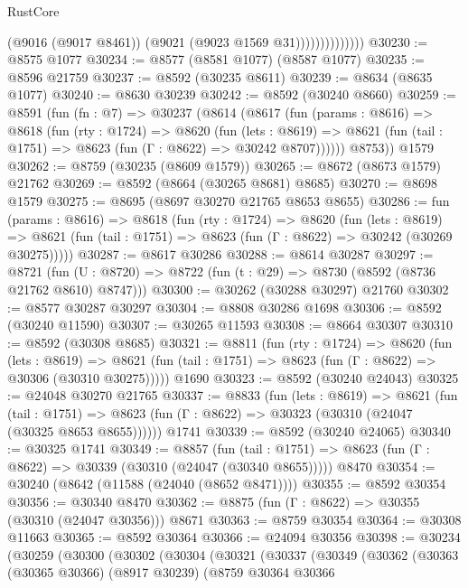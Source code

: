 \begin{lexlean}{RustCore}
\begin{coremodule}
                            (@9016 (@9017 @8461))
                            (@9021 (@9023 @1569 @31))))))))))))))
@30230 := @8575 @1077
@30234 := @8577 (@8581 @1077) (@8587 @1077)
@30235 := @8596 @21759
@30237 := @8592 (@30235 @8611)
@30239 := @8634 (@8635 @1077)
@30240 := @8630 @30239
@30242 := @8592 (@30240 @8660)
@30259 := @8591
    (fun (fn : @7) =>
    @30237
      (@8614
        (@8617
          (fun (params : @8616) =>
          @8618
            (fun (rty : @1724) =>
            @8620
              (fun (lets : @8619) =>
              @8621 (fun (tail : @1751) => @8623 (fun (Γ : @8622) => @30242 @8707))))))
        @8753))
    @1579
@30262 := @8759 (@30235 (@8609 @1579))
@30265 := @8672 (@8673 @1579) @21762
@30269 := @8592 (@8664 (@30265 @8681) @8685)
@30270 := @8698 @1579
@30275 := @8695 (@8697 @30270 @21765 @8653 @8655)
@30286 := fun (params : @8616) =>
  @8618
    (fun (rty : @1724) =>
    @8620
      (fun (lets : @8619) =>
      @8621 (fun (tail : @1751) => @8623 (fun (Γ : @8622) => @30242 (@30269 @30275)))))
@30287 := @8617 @30286
@30288 := @8614 @30287
@30297 := @8721
    (fun (U : @8720) => @8722 (fun (t : @29) => @8730 (@8592 (@8736 @21762 @8610) @8747)))
@30300 := @30262 (@30288 @30297) @21760
@30302 := @8577 @30287 @30297
@30304 := @8808 @30286 @1698
@30306 := @8592 (@30240 @11590)
@30307 := @30265 @11593
@30308 := @8664 @30307
@30310 := @8592 (@30308 @8685)
@30321 := @8811
    (fun (rty : @1724) =>
    @8620
      (fun (lets : @8619) =>
      @8621 (fun (tail : @1751) => @8623 (fun (Γ : @8622) => @30306 (@30310 @30275)))))
    @1690
@30323 := @8592 (@30240 @24043)
@30325 := @24048 @30270 @21765
@30337 := @8833
    (fun (lets : @8619) =>
    @8621
      (fun (tail : @1751) =>
      @8623 (fun (Γ : @8622) => @30323 (@30310 (@24047 (@30325 @8653 @8655))))))
    @1741
@30339 := @8592 (@30240 @24065)
@30340 := @30325 @1741
@30349 := @8857
    (fun (tail : @1751) => @8623 (fun (Γ : @8622) => @30339 (@30310 (@24047 (@30340 @8655)))))
    @8470
@30354 := @30240 (@8642 (@11588 (@24040 (@8652 @8471))))
@30355 := @8592 @30354
@30356 := @30340 @8470
@30362 := @8875 (fun (Γ : @8622) => @30355 (@30310 (@24047 @30356))) @8671
@30363 := @8759 @30354
@30364 := @30308 @11663
@30365 := @8592 @30364
@30366 := @24094 @30356
@30398 := @30234
    (@30259
      (@30300
        (@30302
          (@30304
            (@30321
              (@30337
                (@30349
                  (@30362
                    (@30363
                      (@30365 @30366)
                      (@8917 @30239)
                      (@8759
                        @30364
                        @30366

\end{coremodule}
\end{lexlean}
